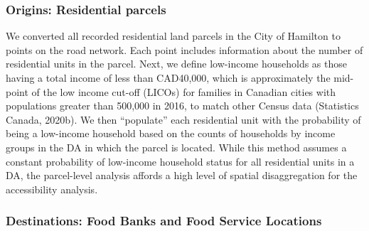 \documentclass[]{elsarticle} %
\begin{document}
\hypertarget{origins-residential-parcels}{%
\subsubsection{Origins: Residential
parcels}\label{origins-residential-parcels}}

We converted all recorded residential land parcels in the City of
Hamilton to points on the road network. Each point includes information
about the number of residential units in the parcel. Next, we define
low-income households as those having a total income of less than
CAD40,000, which is approximately the mid-point of the low income
cut-off (LICOs) for families in Canadian cities with populations greater
than 500,000 in 2016, to match other Census data (Statistics Canada,
2020b). We then ``populate'' each residential unit with the probability
of being a low-income household based on the counts of households by
income groups in the DA in which the parcel is located. While this
method assumes a constant probability of low-income household status for
all residential units in a DA, the parcel-level analysis affords a high
level of spatial disaggregation for the accessibility analysis.

\hypertarget{destinations-food-banks-and-food-service-locations}{%
\subsubsection{Destinations: Food Banks and Food Service
Locations}\label{destinations-food-banks-and-food-service-locations}}
\end{document}
